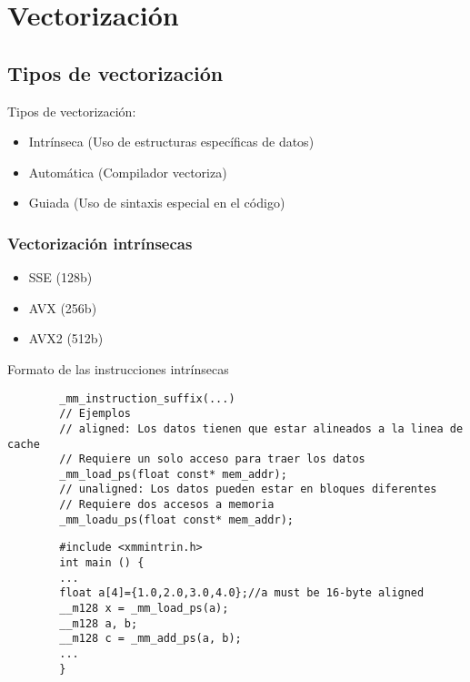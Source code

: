 \documentclass{article}
\begin{document}
\tableofcontents

\section{Vectorización}
  \subsection{Tipos de vectorización}
    Tipos de vectorización:
    \begin{itemize}
      \item Intrínseca (Uso de estructuras específicas de datos)
      \item Automática (Compilador vectoriza)
      \item Guiada (Uso de sintaxis especial en el código)
    \end{itemize}

    \subsubsection{Vectorización intrínsecas}
      \begin{itemize}
        \item SSE (128b)
        \item AVX (256b)
        \item AVX2 (512b)
      \end{itemize}

      Formato de las instrucciones intrínsecas

      \begin{verbatim}
        _mm_instruction_suffix(...)
        // Ejemplos
        // aligned: Los datos tienen que estar alineados a la linea de cache
        // Requiere un solo acceso para traer los datos
        _mm_load_ps(float const* mem_addr);
        // unaligned: Los datos pueden estar en bloques diferentes
        // Requiere dos accesos a memoria
        _mm_loadu_ps(float const* mem_addr);
      \end{verbatim}

      \newpage

      \begin{verbatim}
        #include <xmmintrin.h>
        int main () {
        ...
        float a[4]={1.0,2.0,3.0,4.0};//a must be 16-byte aligned
        __m128 x = _mm_load_ps(a);
        __m128 a, b;
        __m128 c = _mm_add_ps(a, b);
        ...
        }
      \end{verbatim}
\end{document}
